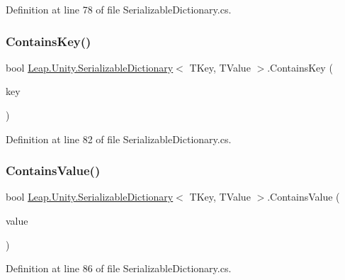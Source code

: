 Definition at line 78 of file Serializable\+Dictionary.\+cs.

\mbox{\label{class_leap_1_1_unity_1_1_serializable_dictionary_adb0dfe61a1e4012e51235683bbdba17b}} 
\subsubsection{\texorpdfstring{ContainsKey()}{ContainsKey()}}
{\footnotesize\ttfamily bool \mbox{\hyperlink{class_leap_1_1_unity_1_1_serializable_dictionary}{Leap.\+Unity.\+Serializable\+Dictionary}}$<$ T\+Key, T\+Value $>$.Contains\+Key (\begin{DoxyParamCaption}\item[{T\+Key}]{key }\end{DoxyParamCaption})}



Definition at line 82 of file Serializable\+Dictionary.\+cs.

\mbox{\label{class_leap_1_1_unity_1_1_serializable_dictionary_a3c33b37ec2f3ed641a8bd26edebe13d8}} 
\subsubsection{\texorpdfstring{ContainsValue()}{ContainsValue()}}
{\footnotesize\ttfamily bool \mbox{\hyperlink{class_leap_1_1_unity_1_1_serializable_dictionary}{Leap.\+Unity.\+Serializable\+Dictionary}}$<$ T\+Key, T\+Value $>$.Contains\+Value (\begin{DoxyParamCaption}\item[{T\+Value}]{value }\end{DoxyParamCaption})}



Definition at line 86 of file Serializable\+Dictionary.\+cs.

